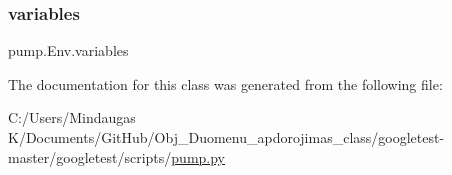 \subsubsection{\texorpdfstring{variables}{variables}}
{\footnotesize\ttfamily pump.\+Env.\+variables}



The documentation for this class was generated from the following file\+:\begin{DoxyCompactItemize}
\item 
C\+:/\+Users/\+Mindaugas K/\+Documents/\+Git\+Hub/\+Obj\+\_\+\+Duomenu\+\_\+apdorojimas\+\_\+class/googletest-\/master/googletest/scripts/\mbox{\hyperlink{googletest-master_2googletest_2scripts_2pump_8py}{pump.\+py}}\end{DoxyCompactItemize}
